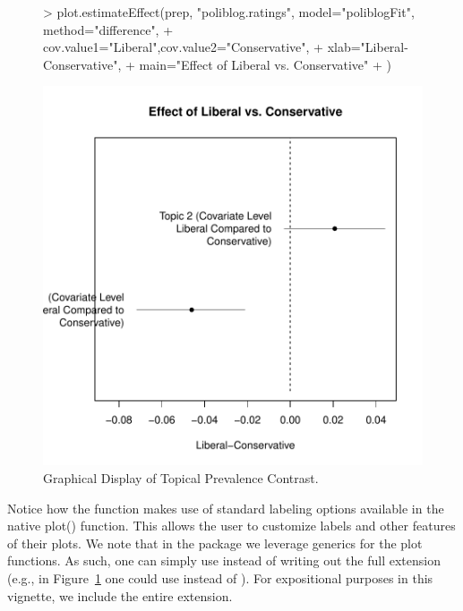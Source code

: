\documentclass[nojss]{jss}
\begin{document}
\begin{figure}[t!]
\begin{center}
\begin{Schunk}
\begin{Sinput}
> plot.estimateEffect(prep, "poliblog.ratings", model="poliblogFit", method="difference",
+             cov.value1="Liberal",cov.value2="Conservative",
+            xlab="Liberal-Conservative",
+            main="Effect of Liberal vs. Conservative"
+            )
\end{Sinput}
\end{Schunk}
\includegraphics{stmVignette-012}
\caption{Graphical Display of Topical Prevalence Contrast.}
\label{fig:difference}
\end{center}
\end{figure}


Notice how the function makes use of standard labeling options available in the native plot() function. This allows the user to customize labels and other features of their plots. We note that in the package we leverage generics for the plot functions. As such, one can simply use  instead of writing out the full extension (e.g., in Figure~\ref{fig:difference} one could use  instead of ). For expositional purposes in this vignette, we include the entire extension.
\end{document}
